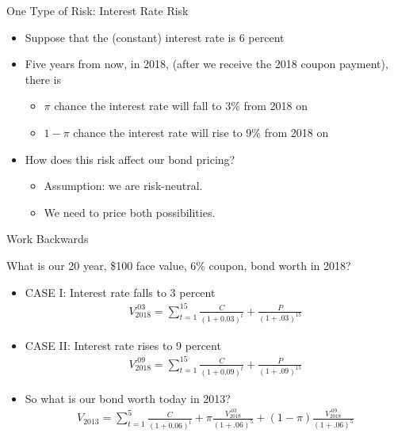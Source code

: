 \documentclass[professionalfonts,small]{beamer}
\begin{document}
\begin{frame}{One Type of Risk:  Interest Rate Risk}

\begin{itemize}

\item Suppose that the (constant) interest rate is 6 percent

\medskip

\item Five years from now, in 2018, (after we receive the 2018 coupon payment), there is
\begin{itemize}
\item $\pi$ chance the interest rate will fall to 3\% from 2018 on
\item $1-\pi$ chance the interest rate will rise to 9\% from 2018 on
\end{itemize}

\medskip

\item How does this risk affect our bond pricing?
\begin{itemize}
\item Assumption:  we are risk-neutral.
\item We need to price both possibilities.
\end{itemize}

\end{itemize}

\end{frame}

\begin{frame}{Work Backwards}
\footnotesize


What is our 20 year, \$100 face value, 6\% coupon, bond worth in 2018?

\begin{itemize}
\item CASE I:  Interest rate falls to 3 percent
\begin{eqnarray*}
V_{2018}^{.03} = \sum_{t=1}^{15}\frac{C}{(1+0.03)^t} + \frac{P}{(1+.03)^{15}}
\end{eqnarray*}
\item  CASE II: Interest rate rises to 9 percent
\begin{eqnarray*}
V_{2018}^{.09} = \sum_{t=1}^{15}\frac{C}{(1+0.09)^t} + \frac{P}{(1+.09)^{15}}
\end{eqnarray*}

\item So what is our bond worth today in 2013?
\begin{eqnarray*}
V_{2013} =  \sum_{t=1}^{5}\frac{C}{(1+0.06)^t} + \pi \frac{V_{2018}^{.03}}{(1+.06)^5} + (1-\pi) \frac{V_{2018}^{.09}}{(1+.06)^5}
\end{eqnarray*}

\end{itemize}

\end{frame}
\end{document}
